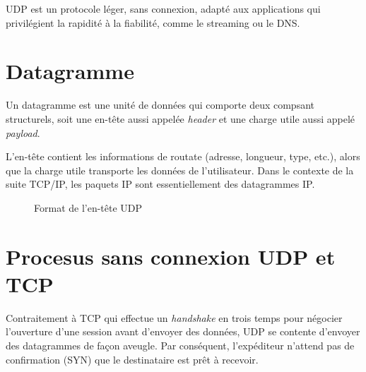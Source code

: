 \documentclass[a4paper, 14pt]{report}
\begin{document}
UDP est un protocole léger, sans connexion, 
      adapté aux applications qui privilégient la rapidité à la fiabilité, 
      comme le streaming ou le DNS.

        \section{Datagramme}
        Un datagramme est une unité de données qui comporte deux compsant structurels, 
        soit une en-tête aussi appelée \textit{header} et  une charge utile 
        aussi appelé \textit{payload}.  

        L'en-tête contient les informations de routate (adresse, longueur, type, etc.), alors que la 
        charge utile transporte les données de l'utilisateur. Dans le contexte de la suite 
        TCP/IP, les paquets IP sont essentiellement des datagrammes IP.
\begin{figure}[H]
\begin{center}
\end{center}
\caption{Format de l’en-tête UDP}
\end{figure}

        \section{Procesus sans connexion UDP et TCP}
        Contraitement à TCP qui effectue un \textit{handshake} en trois temps pour négocier 
        l'ouverture d'une session avant d'envoyer des données, UDP se contente 
        d'envoyer des datagrammes de façon aveugle. Par conséquent, l'expéditeur 
        n'attend pas de confirmation (SYN) que le destinataire est prêt à 
        recevoir. 
\end{document}
